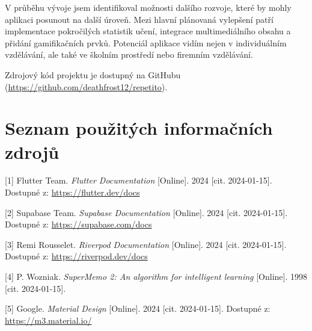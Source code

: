 \documentclass[12pt, a4paper, oneside]{report}
\begin{document}
	V průběhu vývoje jsem identifikoval možnosti dalšího rozvoje, které by mohly aplikaci posunout na další úroveň. Mezi hlavní plánovaná vylepšení patří implementace pokročilých statistik učení, integrace multimediálního obsahu a přidání gamifikačních prvků. Potenciál aplikace vidím nejen v individuálním vzdělávání, ale také ve školním prostředí nebo firemním vzdělávání.

	Zdrojový kód projektu je dostupný na GitHubu (\url{https://github.com/deathfrost12/repetito}).

\chapter*{Seznam použitých informačních zdrojů}

[1] Flutter Team. \textit{Flutter Documentation} [Online]. 2024 [cit. 2024-01-15]. Dostupné z: \url{https://flutter.dev/docs}

[2] Supabase Team. \textit{Supabase Documentation} [Online]. 2024 [cit. 2024-01-15]. Dostupné z: \url{https://supabase.com/docs}

[3] Remi Rousselet. \textit{Riverpod Documentation} [Online]. 2024 [cit. 2024-01-15]. Dostupné z: \url{https://riverpod.dev/docs}

[4] P. Wozniak. \textit{SuperMemo 2: An algorithm for intelligent learning} [Online]. 1998 [cit. 2024-01-15].

[5] Google. \textit{Material Design} [Online]. 2024 [cit. 2024-01-15]. Dostupné z: \url{https://m3.material.io/}
\end{document}
